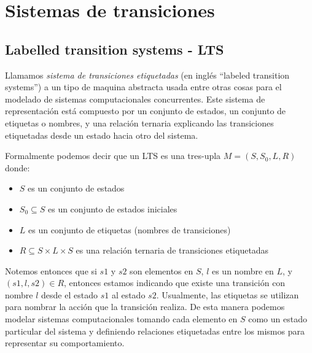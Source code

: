 \documentclass[pdftex,a4paper,12pt]{book}
\begin{document}




\section{Sistemas de transiciones}
\label{LTSaK}

\subsection*{Labelled transition systems - LTS}

Llamamos \textit{sistema de transiciones etiquetadas} (en ingl\'es ``labeled transition systems'') a un tipo de maquina abstracta usada entre otras cosas para el modelado de sistemas computacionales concurrentes. Este sistema de representaci\'on est\'a compuesto por un conjunto de estados, un conjunto de etiquetas o nombres, y una relaci\'on ternaria explicando las transiciones etiquetadas desde un estado hacia otro del sistema.

Formalmente podemos decir que un LTS es una tres-upla $M = (S,S_{0},L,R)$ donde:
\begin{itemize}
\item $S$ es un conjunto de estados
\item $S_0 \subseteq S$ es un conjunto de estados iniciales
\item $L$ es un conjunto de etiquetas (nombres de transiciones)
\item $R \subseteq S \times L \times S$ es una relaci\'on ternaria de transiciones etiquetadas
\end{itemize}
Notemos entonces que si $s1$ y $s2$ son elementos en $S$, $l$ es un nombre en $L$, y $(s1,l,s2) \in R$, entonces estamos indicando que existe una transici\'on con nombre $l$ desde el estado $s1$ al estado $s2$. Usualmente, las etiquetas se utilizan para nombrar la acci\'on que la transici\'on realiza. De esta manera podemos modelar sistemas computacionales tomando cada elemento en $S$ como un estado particular del sistema y definiendo relaciones etiquetadas entre los mismos para representar su comportamiento.
\end{document}
